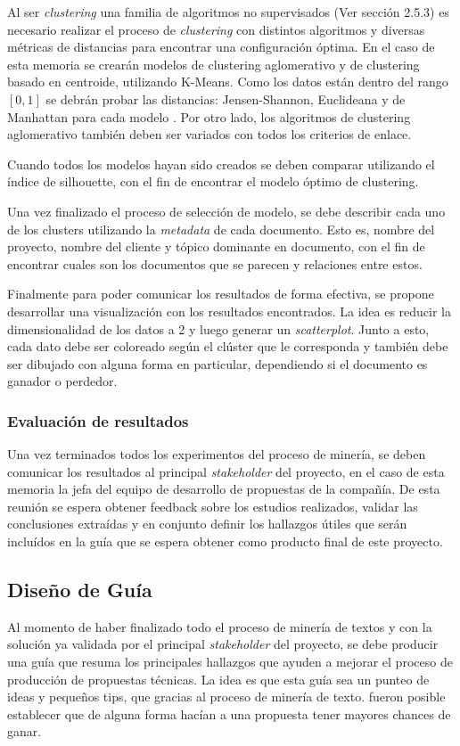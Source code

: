      Al ser \textit{clustering} una familia de algoritmos no supervisados (Ver sección 2.5.3) es necesario realizar el proceso de \textit{clustering} con distintos algoritmos y diversas métricas de distancias para encontrar una configuración óptima. En el caso de esta memoria se crearán modelos de clustering aglomerativo y de clustering basado en centroide, utilizando K-Means. Como los datos están dentro del rango $[0,1]$ se debrán probar las distancias: Jensen-Shannon, Euclideana y de Manhattan para cada modelo . Por otro lado, los algoritmos de clustering aglomerativo también deben ser variados con todos los criterios de enlace.
     
     Cuando todos los modelos hayan sido creados se deben comparar utilizando el índice de silhouette, con el fin de encontrar el modelo óptimo de clustering.
     
     Una vez finalizado el proceso de selección de modelo, se debe describir cada uno de los clusters utilizando la \textit{metadata} de cada documento. Esto es, nombre del proyecto, nombre del cliente y tópico dominante en documento, con el fin de encontrar cuales son los documentos que se parecen y relaciones entre estos.
     
     Finalmente para poder comunicar los resultados de forma efectiva, se propone desarrollar una  visualización con los resultados encontrados. La idea es reducir la dimensionalidad de los datos a 2 y luego generar un \textit{scatterplot}. Junto a esto, cada dato debe ser coloreado según el clúster que le corresponda y también debe ser dibujado con alguna forma en particular, dependiendo si el documento es ganador o perdedor.
   
\subsubsection{Evaluación de resultados}
    Una vez terminados todos los experimentos del proceso de minería, se deben comunicar los resultados al principal \textit{stakeholder} del proyecto, en el caso de esta memoria la jefa del equipo de desarrollo de propuestas de la compañía. De esta reunión se espera obtener feedback sobre los estudios realizados, validar las conclusiones extraídas y en conjunto definir los hallazgos útiles que serán incluídos en la guía que se espera obtener como producto final de este proyecto.
     
\subsection{Diseño de Guía}
     Al momento de haber finalizado todo el proceso de minería de textos y con la solución ya validada por el principal \textit{stakeholder} del proyecto, se debe producir una guía que resuma los principales hallazgos que ayuden a mejorar el proceso de producción de propuestas técnicas. La idea es que esta guía sea un punteo de ideas y pequeños tips, que gracias al proceso de minería de texto. fueron posible establecer que de alguna forma hacían a una propuesta tener mayores chances de ganar.
    

    